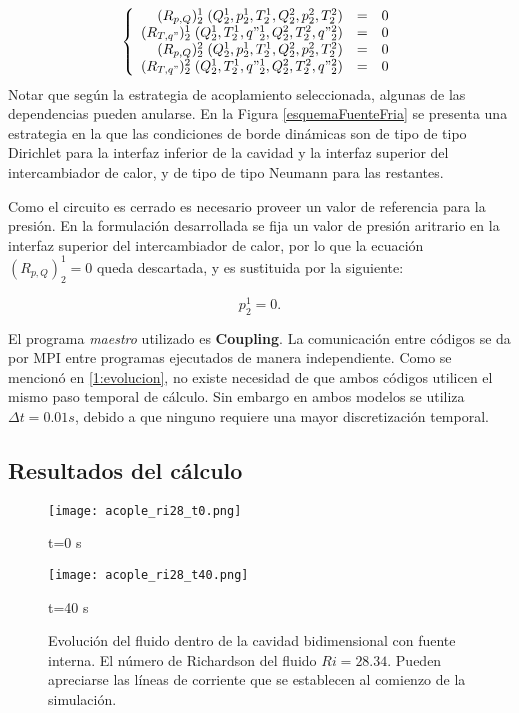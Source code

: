 \begin{equation}
\left\{ \begin{array}{rcl}
(R_{p,Q})_{2}^{1}  \;(Q_2^1, p_2^1, T_2^1, Q_2^2, p_2^2, T_2^2) &=& 0 \\
(R_{T,q"})_{2}^{1} \;(Q_2^1, T_2^1, q"_2^1, Q_2^2, T_2^2, q"_2^2) &=& 0 \\
(R_{p,Q})_{2}^{2}  \;(Q_2^1, p_2^1, T_2^1, Q_2^2, p_2^2, T_2^2) &=& 0 \\
(R_{T,q"})_{2}^{2} \;(Q_2^1, T_2^1, q"_2^1, Q_2^2, T_2^2, q"_2^2) &=& 0
\end{array}
\right.
\label{residuos-2}
\end{equation}
Notar que según la estrategia de acoplamiento seleccionada, algunas de las dependencias pueden anularse.
En la Figura \ref{esquemaFuenteFria} se presenta una estrategia en la que las condiciones de borde dinámicas son 
de tipo de tipo Dirichlet para la interfaz inferior de la cavidad y la interfaz superior del intercambiador de calor, 
y de tipo de tipo Neumann para las restantes.

Como el circuito es cerrado es necesario proveer un valor de referencia para la presión.
En la formulación desarrollada se fija un valor de presión aritrario en la interfaz superior del intercambiador de calor,
por lo que la ecuación $(R_{p,Q})_{2}^{1}=0$ queda descartada, y es sustituida por la siguiente:

\begin{equation*}
p_2^1 = 0.
\end{equation*}

El programa \textit{maestro} utilizado es \textbf{Coupling}.
La comunicación entre códigos se da por MPI entre programas ejecutados de manera independiente.
Como se mencionó en \ref{1:evolucion}, no existe necesidad de que ambos códigos utilicen el mismo paso temporal de cálculo.
Sin embargo en ambos modelos se utiliza $\Delta t=0.01s$, debido a que ninguno requiere una mayor discretización temporal.

\subsection*{Resultados del cálculo}

\begin{figure}[ht]
	\begin{minipage}{0.5\linewidth}
		\centering
		\texttt{[image: acople\_ri28\_t0.png]}
		\caption[]{t=0 s}
		\label{asd}	
	\end{minipage}
	\begin{minipage}{0.5\linewidth}
		\centering
		\texttt{[image: acople\_ri28\_t40.png]}
		\caption[]{t=40 s}
		\label{asd}	
	\end{minipage}
	\caption[Evolución en el transitorio inicial del fluido dentro de la cavidad bidimensional con fuente interna]
  {Evolución del fluido dentro de la cavidad bidimensional con fuente interna.
	El número de Richardson del fluido $Ri=28.34$.
	Pueden apreciarse las líneas de corriente que se establecen al comienzo de la simulación.} 
	\label{acople_ri28_1}
\end{figure}

